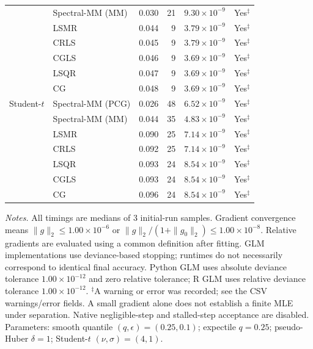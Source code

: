 \begin{longtable}{llrrrc}
 & Spectral-MM (MM) & 0.030 & 21 & $9.30\times10^{-9}$ & Yes$^{\ddagger}$ \\
 & LSMR & 0.044 & 9 & $3.79\times10^{-9}$ & Yes$^{\ddagger}$ \\
 & CRLS & 0.045 & 9 & $3.79\times10^{-9}$ & Yes$^{\ddagger}$ \\
 & CGLS & 0.046 & 9 & $3.69\times10^{-9}$ & Yes$^{\ddagger}$ \\
 & LSQR & 0.047 & 9 & $3.69\times10^{-9}$ & Yes$^{\ddagger}$ \\
 & CG & 0.048 & 9 & $3.69\times10^{-9}$ & Yes$^{\ddagger}$ \\
\midrule
Student-$t$ & Spectral-MM (PCG) & 0.026 & 48 & $6.52\times10^{-9}$ & Yes$^{\ddagger}$ \\
 & Spectral-MM (MM) & 0.044 & 35 & $4.83\times10^{-9}$ & Yes$^{\ddagger}$ \\
 & LSMR & 0.090 & 25 & $7.14\times10^{-9}$ & Yes$^{\ddagger}$ \\
 & CRLS & 0.092 & 25 & $7.14\times10^{-9}$ & Yes$^{\ddagger}$ \\
 & LSQR & 0.093 & 24 & $8.54\times10^{-9}$ & Yes$^{\ddagger}$ \\
 & CGLS & 0.093 & 24 & $8.54\times10^{-9}$ & Yes$^{\ddagger}$ \\
 & CG & 0.096 & 24 & $8.54\times10^{-9}$ & Yes$^{\ddagger}$ \\
\end{longtable}
\noindent\textit{Notes.} All timings are medians of 3 initial-run samples.
Gradient convergence means $\|g\|_2\leq 1.00\times10^{-6}$ or $\|g\|_2/(1+\|g_0\|_2)\leq 1.00\times10^{-8}$.
Relative gradients are evaluated using a common definition after fitting. GLM implementations use deviance-based stopping; runtimes do not necessarily correspond to identical final accuracy.
Python GLM uses absolute deviance tolerance $1.00\times10^{-12}$ and zero relative tolerance; R GLM uses relative deviance tolerance $1.00\times10^{-12}$.
$^{\ddagger}$A warning or error was recorded; see the CSV warnings/error fields. A small gradient alone does not establish a finite MLE under separation.
Native negligible-step and stalled-step acceptance are disabled.
Parameters: smooth quantile $(q,\epsilon)=(0.25,0.1)$; expectile $q=0.25$; pseudo-Huber $\delta=1$; Student-$t$ $(\nu,\sigma)=(4,1)$.
\par
\endgroup

